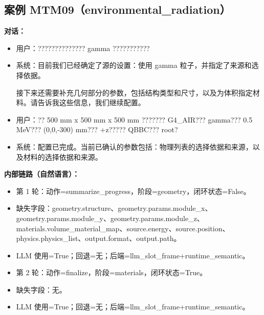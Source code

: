 \documentclass[11pt]{ctexart}
\begin{document}
\subsection{案例 MTM09（environmental\_radiation）}
\textbf{对话：}
\begin{itemize}
\item 用户：?????????????? gamma ???????????
\item 系统：目前我们已经确定了源的设置：使用 gamma 粒子，并指定了来源和选择依据。

接下来还需要补充几何部分的参数，包括结构类型和尺寸，以及为体积指定材料。请告诉我这些信息，我们继续配置。
\item 用户：?? 500 mm x 500 mm x 500 mm ??????? G4\_AIR??? gamma??? 0.5 MeV??? (0,0,-300) mm??? +z????? QBBC??? root?
\item 系统：配置已完成。当前已确认的参数包括：物理列表的选择依据和来源，以及材料的选择依据和来源。
\end{itemize}
\textbf{内部链路（自然语言）：}
\begin{itemize}
\item 第 1 轮：动作=summarize\_progress，阶段=geometry，闭环状态=False。
\item 缺失字段：geometry.structure、geometry.params.module\_x、geometry.params.module\_y、geometry.params.module\_z、materials.volume\_material\_map、source.energy、source.position、physics.physics\_list、output.format、output.path。
\item LLM 使用=True；回退=无；后端=llm\_slot\_frame+runtime\_semantic。
\item 第 2 轮：动作=finalize，阶段=materials，闭环状态=True。
\item 缺失字段：无。
\item LLM 使用=True；回退=无；后端=llm\_slot\_frame+runtime\_semantic。
\end{itemize}
\end{document}
